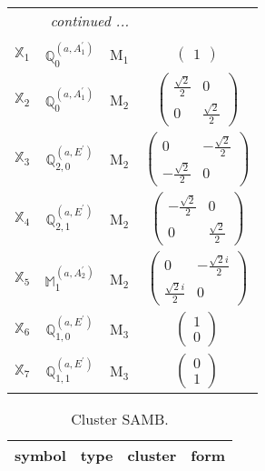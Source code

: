 \documentclass[fleqn,10pt,landscape]{article}
\begin{document}
\begin{itemize}
\begin{center}
\begin{longtable}{c|c|c|c}
 \hline \hline
\multicolumn{3}{r}{\footnotesize\it continued ...} \\ \endfoot

 \hline \hline
\multicolumn{3}{r}{} \\ \endlastfoot

$ \mathbb{X}_{1} $ & $\mathbb{Q}_{0}^{(a,A_{1}^{\prime})}$ & M$_{1}$ & $\begin{pmatrix} 1 \end{pmatrix}$ \\ \hline
$ \mathbb{X}_{2} $ & $\mathbb{Q}_{0}^{(a,A_{1}^{\prime})}$ & M$_{2}$ & $\begin{pmatrix} \frac{\sqrt{2}}{2} & 0 \\ 0 & \frac{\sqrt{2}}{2} \end{pmatrix}$ \\
$ \mathbb{X}_{3} $ & $\mathbb{Q}_{2,0}^{(a,E^{\prime})}$ & M$_{2}$ & $\begin{pmatrix} 0 & - \frac{\sqrt{2}}{2} \\ - \frac{\sqrt{2}}{2} & 0 \end{pmatrix}$ \\
$ \mathbb{X}_{4} $ & $\mathbb{Q}_{2,1}^{(a,E^{\prime})}$ & M$_{2}$ & $\begin{pmatrix} - \frac{\sqrt{2}}{2} & 0 \\ 0 & \frac{\sqrt{2}}{2} \end{pmatrix}$ \\
$ \mathbb{X}_{5} $ & $\mathbb{M}_{1}^{(a,A_{2}^{\prime})}$ & M$_{2}$ & $\begin{pmatrix} 0 & - \frac{\sqrt{2} i}{2} \\ \frac{\sqrt{2} i}{2} & 0 \end{pmatrix}$ \\ \hline
$ \mathbb{X}_{6} $ & $\mathbb{Q}_{1,0}^{(a,E^{\prime})}$ & M$_{3}$ & $\begin{pmatrix} 1 \\ 0 \end{pmatrix}$ \\
$ \mathbb{X}_{7} $ & $\mathbb{Q}_{1,1}^{(a,E^{\prime})}$ & M$_{3}$ & $\begin{pmatrix} 0 \\ 1 \end{pmatrix}$ \\
\end{longtable}
\end{center}
\begin{center}
\renewcommand{\arraystretch}{1.3}
\begin{longtable}{c|c|c|c}
\caption{Cluster SAMB.}
 \\
 \hline \hline
symbol & type & cluster & form \\ \hline \endfirsthead


\end{longtable}
\end{center}
\end{itemize}
\end{document}
